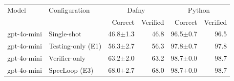 \begin{tabular}{llrrrr}
\toprule
Model & Configuration & \multicolumn{2}{c}{Dafny} & \multicolumn{2}{c}{Python} \\
 & & Correct & Verified & Correct & Verified \\
\midrule
gpt-4o-mini & Single-shot & 46.8$\pm$1.3 & 46.8 & 96.5$\pm$0.7 & 96.5 \\
gpt-4o-mini & Testing-only (E1) & 56.3$\pm$2.7 & 56.3 & 97.8$\pm$0.7 & 97.8 \\
gpt-4o-mini & Verifier-only & 63.2$\pm$2.0 & 63.2 & 98.7$\pm$0.0 & 98.7 \\
gpt-4o-mini & SpecLoop (E3) & 68.0$\pm$2.7 & 68.0 & 98.7$\pm$0.0 & 98.7 \\
\bottomrule
\end{tabular}